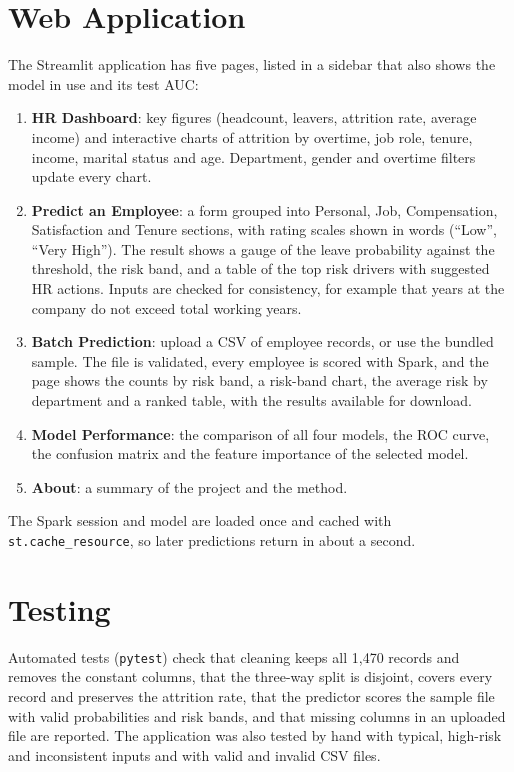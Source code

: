 \documentclass[12pt,a4paper]{report}
\begin{document}
\section{Web Application}

The Streamlit application has five pages, listed in a sidebar that also shows the model in use and its test AUC:

\begin{enumerate}
\item \textbf{HR Dashboard}: key figures (headcount, leavers, attrition rate, average income) and interactive charts of attrition by overtime, job role, tenure, income, marital status and age. Department, gender and overtime filters update every chart.
\item \textbf{Predict an Employee}: a form grouped into Personal, Job, Compensation, Satisfaction and Tenure sections, with rating scales shown in words (``Low'', ``Very High''). The result shows a gauge of the leave probability against the threshold, the risk band, and a table of the top risk drivers with suggested HR actions. Inputs are checked for consistency, for example that years at the company do not exceed total working years.
\item \textbf{Batch Prediction}: upload a CSV of employee records, or use the bundled sample. The file is validated, every employee is scored with Spark, and the page shows the counts by risk band, a risk-band chart, the average risk by department and a ranked table, with the results available for download.
\item \textbf{Model Performance}: the comparison of all four models, the ROC curve, the confusion matrix and the feature importance of the selected model.
\item \textbf{About}: a summary of the project and the method.
\end{enumerate}

The Spark session and model are loaded once and cached with \texttt{st.cache\_resource}, so later predictions return in about a second.

\section{Testing}

Automated tests (\texttt{pytest}) check that cleaning keeps all 1,470 records and removes the constant columns, that the three-way split is disjoint, covers every record and preserves the attrition rate, that the predictor scores the sample file with valid probabilities and risk bands, and that missing columns in an uploaded file are reported. The application was also tested by hand with typical, high-risk and inconsistent inputs and with valid and invalid CSV files.
\end{document}

